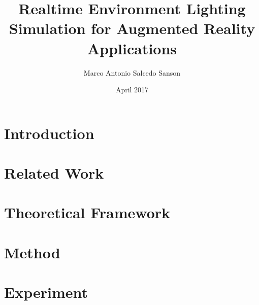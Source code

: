 \documentclass{report}
\title{Realtime Environment Lighting Simulation for Augmented Reality  Applications}
\author{Marco Antonio Salcedo Sanson }
\date{April 2017}
\begin{document}
\maketitle
\clearpage

\tableofcontents{}
\clearpage

\chapter{Introduction}



\chapter{Related Work}


\chapter{Theoretical Framework}


\chapter{Method}


\chapter{Experiment}


\clearpage


\nocite{*}

\end{document}
